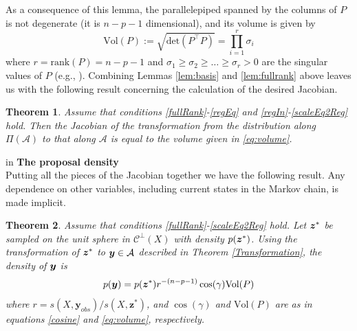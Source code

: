 \documentclass[12pt]{article}
\newcommand{\by}{\mbox{\boldmath $y$}}
\newcommand{\bz}{\mbox{\boldmath $z$}}
\newcommand{\mc}{\mathcal}
\newtheorem{theorem}{Theorem}[section]
\begin{document}
As a consequence of this lemma, 
the parallelepiped spanned by the columns of $P$ is not
degenerate (it is $n-p-1$ dimensional), and its volume
is given by
\begin{equation}
\label{eq:volume}
\text{Vol} (P) := \sqrt{\text{det}(P^\top P)}=\prod_{i=1}^{r} \sigma_i
\end{equation}
where $r=\text{rank} (P)=n-p-1$ and $\sigma_1\geq
\sigma_2\geq\dots\geq\sigma_r>0$ are the singular values of $P$ (e.g.,
\cite{miao1992}). 
Combining Lemmas \ref{lem:basis} and \ref{lem:fullrank} above leaves us with the following result concerning the calculation of the desired Jacobian.  
\begin{theorem}
\label{Jacobian}
Assume that conditions \ref{fullRank}-\ref{regEq} and \ref{regIn}-\ref{scaleEq2Reg} hold.  Then the
Jacobian of the transformation from the distribution along 
$\Pi(\mc A)$ to that along $\mc A $ is equal to the volume given in \eqref{eq:volume}.
\end{theorem}

 in
\noindent
{\bf The proposal density} \\
Putting all the pieces of the Jacobian together we have the following result. Any dependence on other variables, including current states in the Markov chain, is made implicit. 
\begin{theorem} 
Assume that conditions \ref{fullRank}-\ref{scaleEq2Reg} hold.  Let $\bz^{*}$ be sampled on the unit sphere in $\mc {C}^\perp (X)$ with density $p(\bz^{*})$.  Using the transformation of $\bz^*$ to $\by\in \mc A$ described in Theorem \ref{Transformation}, the density of $\by$ is
\begin{equation}
\label{dens:ystst}
p(\by)=p(\bz^*) r^{-(n-p-1)} \cos(\gamma)\text{Vol} (P)
\end{equation}
where $r={s(X,\boldsymbol{y}_{obs})}/{s(X,  \boldsymbol{z}^{*})}$,
and $\cos(\gamma)$ and $\text{Vol} (P)$ are as in equations \eqref{cosine} and \eqref{eq:volume}, respectively. 
\end{theorem} 
\end{document}
